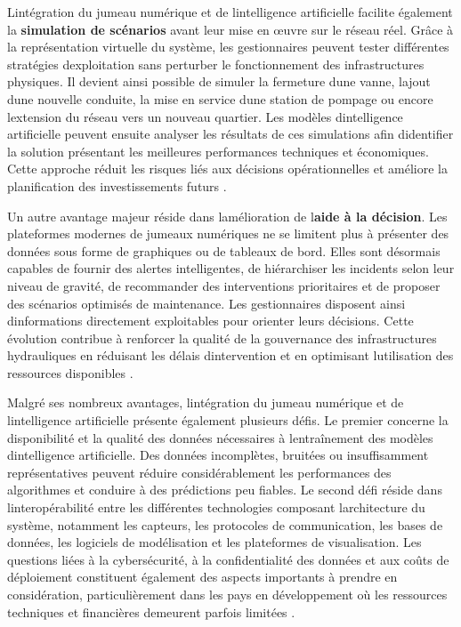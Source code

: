 \documentclass[12pt,a4paper,oneside]{report}
\begin{document}
L\textquotesingle intégration du jumeau numérique et de
l\textquotesingle intelligence artificielle facilite également la
\textbf{simulation de scénarios} avant leur mise en œuvre sur le réseau
réel. Grâce à la représentation virtuelle du système, les gestionnaires
peuvent tester différentes stratégies d\textquotesingle exploitation
sans perturber le fonctionnement des infrastructures physiques. Il
devient ainsi possible de simuler la fermeture d\textquotesingle une
vanne, l\textquotesingle ajout d\textquotesingle une nouvelle conduite,
la mise en service d\textquotesingle une station de pompage ou encore
l\textquotesingle extension du réseau vers un nouveau quartier. Les
modèles d\textquotesingle intelligence artificielle peuvent ensuite
analyser les résultats de ces simulations afin
d\textquotesingle identifier la solution présentant les meilleures
performances techniques et économiques. Cette approche réduit les
risques liés aux décisions opérationnelles et améliore la planification
des investissements futurs \cite{ref17}.

Un autre avantage majeur réside dans l\textquotesingle amélioration de
l\textquotesingle{}\textbf{aide à la décision}. Les plateformes modernes
de jumeaux numériques ne se limitent plus à présenter des données sous
forme de graphiques ou de tableaux de bord. Elles sont désormais
capables de fournir des alertes intelligentes, de hiérarchiser les
incidents selon leur niveau de gravité, de recommander des interventions
prioritaires et de proposer des scénarios optimisés de maintenance. Les
gestionnaires disposent ainsi d\textquotesingle informations directement
exploitables pour orienter leurs décisions. Cette évolution contribue à
renforcer la qualité de la gouvernance des infrastructures hydrauliques
en réduisant les délais d\textquotesingle intervention et en optimisant
l\textquotesingle utilisation des ressources disponibles \cite{ref21}.

Malgré ses nombreux avantages, l\textquotesingle intégration du jumeau
numérique et de l\textquotesingle intelligence artificielle présente
également plusieurs défis. Le premier concerne la disponibilité et la
qualité des données nécessaires à l\textquotesingle entraînement des
modèles d\textquotesingle intelligence artificielle. Des données
incomplètes, bruitées ou insuffisamment représentatives peuvent réduire
considérablement les performances des algorithmes et conduire à des
prédictions peu fiables. Le second défi réside dans
l\textquotesingle interopérabilité entre les différentes technologies
composant l\textquotesingle architecture du système, notamment les
capteurs, les protocoles de communication, les bases de données, les
logiciels de modélisation et les plateformes de visualisation. Les
questions liées à la cybersécurité, à la confidentialité des données et
aux coûts de déploiement constituent également des aspects importants à
prendre en considération, particulièrement dans les pays en
développement où les ressources techniques et financières demeurent
parfois limitées \cite{ref60}.
\end{document}
